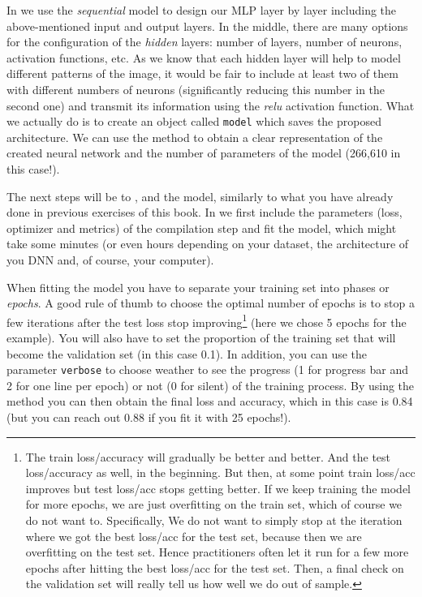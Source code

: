 In  we use the \textit{sequential} model to design our MLP layer by layer including the above-mentioned input and output layers. In the middle, there are many options for the configuration of the \textit{hidden} layers: number of layers, number of neurons, activation functions, etc. As we know that each hidden layer will help to model different patterns of the image, it would be fair to include at least two of them with different numbers of neurons (significantly reducing this number in the second one) and transmit its information using the \textit{relu} activation function. What we actually do is to create an object called \texttt{model} which saves the proposed architecture. We can use the method  to obtain a clear representation of the created neural network and the number of parameters of the model (266,610 in this case!).


The next steps will be to ,  and  the model, similarly to what you have already done in previous exercises of this book. In  we first include the parameters (loss, optimizer and metrics) of the compilation step and fit the model, which might take some minutes (or even hours depending on your dataset, the architecture of you DNN and, of course, your computer). 

When fitting the model you have to separate your training set into phases or \textit{epochs}. A good rule of thumb to choose the optimal number of epochs is to stop a few iterations after the test loss stop improving\footnote{The train loss/accuracy will gradually be better and better. And the test loss/accuracy as well, in the beginning. But then, at some point train loss/acc improves but test loss/acc stops getting better. If we keep training the model for more epochs, we are just overfitting on the train set, which of course we do not want to. Specifically, We do not want to simply stop at the iteration where we got the best loss/acc for the test set, because then we are overfitting on the test set. Hence practitioners often let it run for a few more epochs after hitting the best loss/acc for the test set. Then, a final check on the validation set will really tell us how well we do out of sample.}   (here we chose 5 epochs for the example). You will also have to set the proportion of the training set that will become the validation set (in this case 0.1). In addition, you can use the parameter \texttt{verbose} to choose weather to see the progress (1 for progress bar and 2 for one line per epoch) or not (0 for silent) of the training process. By using the method  you can then obtain the final loss and accuracy, which in this case is 0.84 (but you can reach out 0.88 if you fit it with 25 epochs!).

